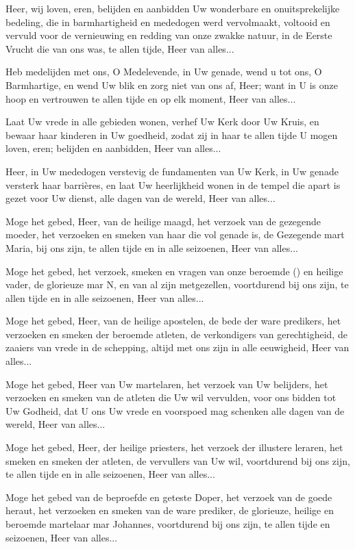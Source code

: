 \documentclass[12pt,twoside,a5paper]{article}
\begin{document}
\begin{halfparskip}

   Heer, wij loven, eren, belijden en aanbidden Uw wonderbare en onuitsprekelijke bedeling, die in barmhartigheid en mededogen werd vervolmaakt, voltooid en vervuld voor de vernieuwing en redding van onze zwakke natuur, in de Eerste Vrucht die van ons was, te allen tijde, Heer van alles...

   Heb medelijden met ons, O Medelevende, in Uw genade, wend u tot ons, O Barmhartige, en wend Uw blik en zorg niet van ons af, Heer; want in U is onze hoop en vertrouwen te allen tijde en op elk moment, Heer van alles...

   Laat Uw vrede in alle gebieden wonen, verhef Uw Kerk door Uw Kruis, en bewaar haar kinderen in Uw goedheid, zodat zij in haar te allen tijde U mogen loven, eren; belijden en aanbidden, Heer van alles...

   Heer, in Uw mededogen verstevig de fundamenten van Uw Kerk, in Uw genade versterk haar barrières, en laat Uw heerlijkheid wonen in de tempel die apart is gezet voor Uw dienst, alle dagen van de wereld, Heer van alles...

   Moge het gebed, Heer, van de heilige maagd, het verzoek van de gezegende moeder, het verzoeken en smeken van haar die vol genade is, de Gezegende mart Maria, bij ons zijn, te allen tijde en in alle seizoenen, Heer van alles...

   Moge het gebed, het verzoek, smeken en vragen van onze beroemde () en heilige vader, de glorieuze mar N, en van al zijn metgezellen, voortdurend bij ons zijn, te allen tijde en in alle seizoenen, Heer van alles...

   Moge het gebed, Heer, van de heilige apostelen, de bede der ware predikers, het verzoeken en smeken der beroemde atleten, de verkondigers van gerechtigheid, de zaaiers van vrede in de schepping, altijd met ons zijn in alle eeuwigheid, Heer van alles...

   Moge het gebed, Heer van Uw martelaren, het verzoek van Uw belijders, het verzoeken en smeken van de atleten die Uw wil vervulden, voor ons bidden tot Uw Godheid, dat U ons Uw vrede en voorspoed mag schenken alle dagen van de wereld, Heer van alles...

   Moge het gebed, Heer, der heilige priesters, het verzoek der illustere leraren, het smeken en smeken der atleten, de vervullers van Uw wil, voortdurend bij ons zijn, te allen tijde en in alle seizoenen, Heer van alles...

   Moge het gebed van de beproefde en geteste Doper, het verzoek van de goede heraut, het verzoeken en smeken van de ware prediker, de glorieuze, heilige en beroemde martelaar mar Johannes, voortdurend bij ons zijn, te allen tijde en seizoenen, Heer van alles...
\end{halfparskip}
\end{document}
